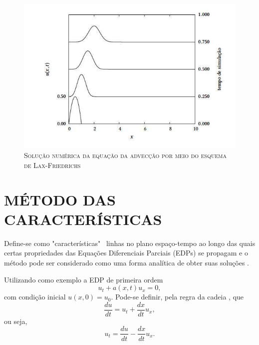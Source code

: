 \begin{figure}[H]
	\centering
	\includegraphics[scale=1]{figuras/Dias_B.jpg}
	\caption{\textsc{Solução numérica da equação da advecção por meio do esquema de Lax-Friedrichs}}
	\vspace{-0.1cm}
	\label{fig:Dias_B}
\end{figure}

\section{MÉTODO DAS CARACTERÍSTICAS} \label{Caracteristicas}

Define-se como "características" \ linhas no plano espaço-tempo ao longo das quais certas propriedades das Equações Diferenciais Parciais (EDPs) se propagam e o método pode ser considerado como uma forma analítica de obter suas soluções \cite{Cunge}.

Utilizando como exemplo a EDP de primeira ordem
\begin{equation}\label{exempcarac}
u_t +a(x,t)u_x=0,
\end{equation}
com condição inicial $u(x,0)=u_0$. Pode-se definir, pela regra da cadeia \cite{Leithold}, que
\begin{equation*}
\frac{du}{dt} = u_t + \frac{dx}{dt}u_x,
\end{equation*}
ou seja, 
\begin{equation} \label{uisolado}
u_t = \frac{du}{dt} - \frac{dx}{dt}u_x.
\end{equation}

